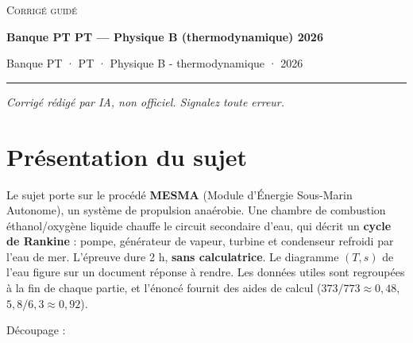 \documentclass[11pt,a4paper]{article}
\begin{document}
\thispagestyle{plain}
\begin{center}
  {\small\scshape Corrigé guidé}\par\smallskip
  {\LARGE\bfseries Banque PT PT — Physique B (thermodynamique) 2026\par}\medskip
  {\large Banque PT · PT · Physique B - thermodynamique · 2026\par}
\end{center}
\vspace{2pt}\hrule\vspace{8pt}

\emph{Corrigé rédigé par IA, non officiel. Signalez toute erreur.}

\hypertarget{pruxe9sentation-du-sujet}{%
\section{Présentation du sujet}\label{pruxe9sentation-du-sujet}}

Le sujet porte sur le procédé \textbf{MESMA} (Module d'Énergie Sous-Marin Autonome), un système de propulsion anaérobie. Une chambre de combustion éthanol/oxygène liquide chauffe le circuit secondaire d'eau, qui décrit un \textbf{cycle de Rankine} : pompe, générateur de vapeur, turbine et condenseur refroidi par l'eau de mer. L'épreuve dure 2 h, \textbf{sans calculatrice}. Le diagramme \((T,s)\) de l'eau figure sur un document réponse à rendre. Les données utiles sont regroupées à la fin de chaque partie, et l'énoncé fournit des aides de calcul (\(373/773\approx0{,}48\), \(5{,}8/6{,}3\approx0{,}92\)).

Découpage :
\end{document}
